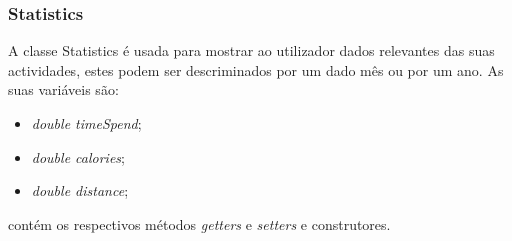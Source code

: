 \documentclass[10pt,notitlepage]{article}
\begin{document}
\subsubsection{Statistics}

A classe Statistics é usada para mostrar ao utilizador dados relevantes das suas actividades, estes podem ser descriminados por um dado mês ou por um ano. As suas variáveis são:
\begin{itemize}
\item \textit{double timeSpend};
\item \textit{double calories};
\item \textit{double distance};
\end{itemize}
contém os respectivos métodos \textit{getters} e \textit{setters} e construtores.
\end{document}
